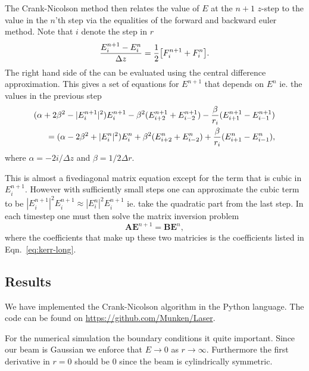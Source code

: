 The Crank-Nicolson method then relates the value of $E$ at the $n+1$ $z$-step to the value in the
$n$'th step via the equalities of the forward and backward euler method. Note that $i$ denote the
step in $r$
\begin{equation}
  \label{eq:Crank-Nicolson-discrete}
  \frac{E^{n+1}_{i} - E^{n}_{i}}{\Delta z} = \frac{1}{2} \big[F_{i}^{n+1}+F_{i}^{n} \big].
\end{equation}
The right hand side of the can be evaluated using the central difference approximation. This gives
a set of equations for $E^{n+1}$ that depends on $E^{n}$ ie. the values in the previous step
\begin{align}
  \notag
  (\alpha + 2\beta^{2} - |E_{i}^{n+1}|^{2})E_{i}^{n+1} - \beta^{2}(E_{i+2}^{n+1} + E_{i-2}^{n+1}) -
  \frac{\beta}{r_{i}} (E_{i+1}^{n+1} - E_{i-1}^{n+1}) \\
  = (\alpha - 2\beta^{2} + |E_{i}^{n}|^{2})E_{i}^{n} + \beta^{2}(E_{i+2}^{n} + E_{i-2}^{n}) +
  \frac{\beta}{r_{i}} (E_{i+1}^{n} - E_{i-1}^{n}), 
  \label{eq:kerr-long}
\end{align}
where $\alpha = -2i/\!{\Delta z}$ and $\beta = 1/{2 \Delta r}$.

This is almost a fivediagonal matrix equation except for the term that is cubic in
$E_{i}^{n+1}$. However with sufficiently small steps one can approximate the cubic term to be
$|E_{i}^{n+1}|^{2}E_{i}^{n+1} \approx |E_{i}^{n}|^{2}E_{i}^{n+1}$ ie. take the quadratic part from
the last step. In each timestep one must then solve the matrix inversion problem
\begin{equation}
  \label{eq:matrix}
  \mathbf{A} \mathbf{E}^{n+1} = \mathbf{B} \mathbf{E}^{n}, 
\end{equation}
where the coefficients that make up these two matricies is the coefficients listed in
Eqn.~\eqref{eq:kerr-long}. 

\subsection{Results}
\label{sec:kerr-results}

We have implemented the Crank-Nicolson algorithm in the Python language. The code can be found on
\url{https://github.com/Munken/Laser}.

For the numerical simulation the boundary conditions it quite important. Since our beam is Gaussian
we enforce that $E \rightarrow 0$ as $r \rightarrow \infty$. Furthermore the first derivative in $r
= 0$ should be 0 since the beam is cylindrically symmetric.

